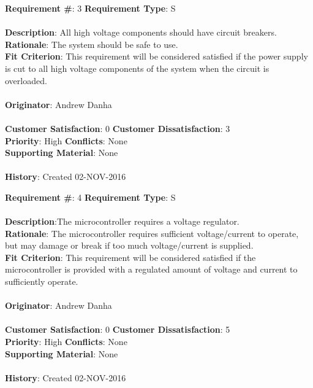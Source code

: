 \documentclass[titlepage]{article}
\begin{document}
\begin{framed}
	\noindent\textbf{Requirement \#}: 3 \hfill \textbf{Requirement Type}: S \hfill\\\\
	\noindent\textbf{Description}: All high voltage components should have circuit breakers.\\
	\textbf{Rationale}: The system should be safe to use.\\
	\textbf{Fit Criterion}: This requirement will be considered satisfied if the power supply is cut to all high voltage components of the system when the circuit is overloaded.\\\\
	\textbf{Originator}: Andrew Danha\\\\
	\noindent\textbf{Customer Satisfaction}: 0 \hfill 	\textbf{Customer Dissatisfaction}: 3 \hfill\\
	\textbf{Priority}: High \hfill \textbf{Conflicts}: None \hfill\\
	\textbf{Supporting Material}: None\\\\
	\noindent\textbf{History}: Created 02-NOV-2016
\end{framed}

\begin{framed}
	\noindent\textbf{Requirement \#}: 4 \hfill \textbf{Requirement Type}: S \hfill\\\\
	\noindent\textbf{Description}:The microcontroller requires a voltage regulator.\\
	\textbf{Rationale}: The microcontroller requires sufficient voltage/current to operate, but may damage or break if too much voltage/current is supplied.\\
	\textbf{Fit Criterion}: This requirement will be considered satisfied if the microcontroller is provided with a regulated amount of voltage and current to sufficiently operate.\\\\
	\textbf{Originator}: Andrew Danha\\\\ 
	\noindent\textbf{Customer Satisfaction}: 0 \hfill 	\textbf{Customer Dissatisfaction}: 5 \hfill\\
	\textbf{Priority}: High \hfill \textbf{Conflicts}: None \hfill\\
	\textbf{Supporting Material}: None\\\\
	\noindent\textbf{History}: Created 02-NOV-2016
\end{framed}
\end{document}
